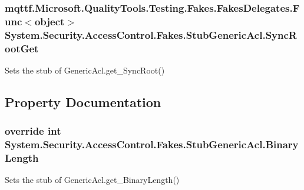 \hypertarget{class_system_1_1_security_1_1_access_control_1_1_fakes_1_1_stub_generic_acl_a9f63698f1d1112d5a938567199a155b6}{
\subsubsection[{Sync\-Root\-Get}]{\setlength{\rightskip}{0pt plus 5cm}mqttf.\-Microsoft.\-Quality\-Tools.\-Testing.\-Fakes.\-Fakes\-Delegates.\-Func$<$object$>$ System.\-Security.\-Access\-Control.\-Fakes.\-Stub\-Generic\-Acl.\-Sync\-Root\-Get}}\label{class_system_1_1_security_1_1_access_control_1_1_fakes_1_1_stub_generic_acl_a9f63698f1d1112d5a938567199a155b6}


Sets the stub of Generic\-Acl.\-get\-\_\-\-Sync\-Root()



\subsection{Property Documentation}
\hypertarget{class_system_1_1_security_1_1_access_control_1_1_fakes_1_1_stub_generic_acl_afcfe72bd78f5b4a5f7c309d4898fd00f}{
\subsubsection[{Binary\-Length}]{\setlength{\rightskip}{0pt plus 5cm}override int System.\-Security.\-Access\-Control.\-Fakes.\-Stub\-Generic\-Acl.\-Binary\-Length\hspace{0.3cm}{\ttfamily [get]}}}\label{class_system_1_1_security_1_1_access_control_1_1_fakes_1_1_stub_generic_acl_afcfe72bd78f5b4a5f7c309d4898fd00f}


Sets the stub of Generic\-Acl.\-get\-\_\-\-Binary\-Length()

